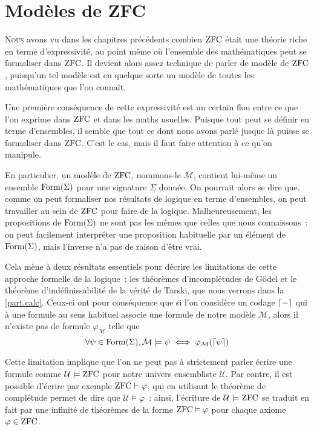 \chapter{Modèles de ZFC}
\label{chp.modZFC}

\minitoc

\lettrine{N}{ous} avons vu dans les chapitres précédents combien $\operatorname{ZFC}$ était
une théorie riche en terme d'expressivité, au point même où l'ensemble des
mathématiques peut se formaliser dans $\operatorname{ZFC}$. Il devient alors assez technique
de parler de modèle de $\operatorname{ZFC}$, puisqu'un tel modèle est en quelque sorte un
modèle de toutes les mathématiques que l'on connaît.

Une première conséquence de cette expressivité est un certain flou entre ce que
l'on exprime dans $\operatorname{ZFC}$ et dans les maths usuelles. Puisque tout peut se
définir en terme d'ensembles, il semble que tout ce dont nous avons parlé jusque
là puisse se formaliser dans $\operatorname{ZFC}$. C'est le cas, mais il faut faire attention
à ce qu'on manipule.

En particulier, un modèle de $\operatorname{ZFC}$, nommons-le $\mathcal M$, contient lui-même
un ensemble $\operatorname{Form}(\Sigma)$ pour une signature $\Sigma$ donnée. On pourrait
alors se dire que, comme on peut formaliser nos résultats de logique en terme
d'ensembles, on peut travailler au sein de $\operatorname{ZFC}$ pour faire de la logique.
Malheureusement, les propositions de $\operatorname{Form}(\Sigma)$ ne sont pas les mêmes
que celles que nous connaissons~: on peut facilement interpréter une proposition
habituelle par un élément de $\operatorname{Form}(\Sigma)$, mais l'inverse n'a pas de
raison d'être vrai.

Cela mène à deux résultats essentiels pour décrire les limitations de cette
approche formelle de la logique~: les théorèmes d'incomplétudes de Gödel et le
théorème d'indéfinissabilité de la vérité de Tarski, que nous verrons dans la
\cref{part.calc}. Ceux-ci ont pour conséquence que si l'on considère un codage
$\lceil-\rceil$ qui à une formule au sens habituel associe une formule de notre
modèle $\mathcal M$, alors il n'existe pas de formule $\varphi_{\mathcal M}$
telle que
\[\forall \psi \in \operatorname{Form}(\Sigma), \mathcal M \models \psi
\iff \mathcal \varphi_{\mathcal M}(\lceil\psi\rceil)\]

Cette limitation implique que l'on ne peut pas à strictement
parler écrire une formule comme $\mathcal U\models \operatorname{ZFC}$ pour notre univers
ensembliste $\mathcal U$. Par contre, il est possible d'écrire par exemple
$\operatorname{ZFC}\vdash \varphi$, qui en utilisant le théorème de complétude permet de dire
que $\mathcal U \models \varphi$~: ainsi, l'écriture de $\mathcal U\models\operatorname{ZFC}$
se traduit en fait par une infinité de théorèmes de la forme
$\operatorname{ZFC}\vDash \varphi$ pour chaque axiome $\varphi \in \operatorname{ZFC}$.

